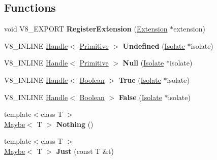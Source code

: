 \subsection*{Functions}
\begin{DoxyCompactItemize}
\item 
\hypertarget{namespacev8_a50b91e1100a42cc12e7295b22d44d9d0}{}void V8\+\_\+\+E\+X\+P\+O\+R\+T {\bfseries Register\+Extension} (\hyperlink{classv8_1_1_extension}{Extension} $\ast$extension)\label{namespacev8_a50b91e1100a42cc12e7295b22d44d9d0}

\item 
\hypertarget{namespacev8_af7d2f7fc42d6873af561b885151168d7}{}V8\+\_\+\+I\+N\+L\+I\+N\+E \hyperlink{classv8_1_1_local}{Handle}$<$ \hyperlink{classv8_1_1_primitive}{Primitive} $>$ {\bfseries Undefined} (\hyperlink{classv8_1_1_isolate}{Isolate} $\ast$isolate)\label{namespacev8_af7d2f7fc42d6873af561b885151168d7}

\item 
\hypertarget{namespacev8_ad3e6b3f6b548745a461b71f3bfb17ef1}{}V8\+\_\+\+I\+N\+L\+I\+N\+E \hyperlink{classv8_1_1_local}{Handle}$<$ \hyperlink{classv8_1_1_primitive}{Primitive} $>$ {\bfseries Null} (\hyperlink{classv8_1_1_isolate}{Isolate} $\ast$isolate)\label{namespacev8_ad3e6b3f6b548745a461b71f3bfb17ef1}

\item 
\hypertarget{namespacev8_acbc2c4a2a277e913ae100014559f6030}{}V8\+\_\+\+I\+N\+L\+I\+N\+E \hyperlink{classv8_1_1_local}{Handle}$<$ \hyperlink{classv8_1_1_boolean}{Boolean} $>$ {\bfseries True} (\hyperlink{classv8_1_1_isolate}{Isolate} $\ast$isolate)\label{namespacev8_acbc2c4a2a277e913ae100014559f6030}

\item 
\hypertarget{namespacev8_aa2d11aede58f5b3b0c2abe92f9c8ee40}{}V8\+\_\+\+I\+N\+L\+I\+N\+E \hyperlink{classv8_1_1_local}{Handle}$<$ \hyperlink{classv8_1_1_boolean}{Boolean} $>$ {\bfseries False} (\hyperlink{classv8_1_1_isolate}{Isolate} $\ast$isolate)\label{namespacev8_aa2d11aede58f5b3b0c2abe92f9c8ee40}

\item 
\hypertarget{namespacev8_ac44d2f17c448576d57576035c8032c46}{}{\footnotesize template$<$class T $>$ }\\\hyperlink{classv8_1_1_maybe}{Maybe}$<$ T $>$ {\bfseries Nothing} ()\label{namespacev8_ac44d2f17c448576d57576035c8032c46}

\item 
\hypertarget{namespacev8_a41f0e280eadfba6ac9afd833fdd540cf}{}{\footnotesize template$<$class T $>$ }\\\hyperlink{classv8_1_1_maybe}{Maybe}$<$ T $>$ {\bfseries Just} (const T \&t)\label{namespacev8_a41f0e280eadfba6ac9afd833fdd540cf}

\end{DoxyCompactItemize}



